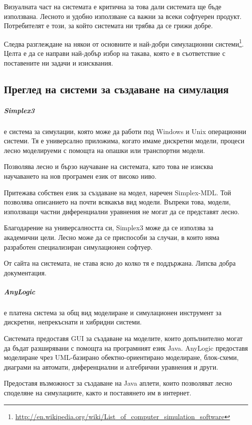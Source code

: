 		Визуалната част на системата е критична за това дали системата ще бъде използвана.
		Лесното и удобно използване са важни за всеки софтуерен продукт. 
		Потребителят е този, за който системата ни трябва да се грижи добре. \cite{Microsoft}
		
		Следва разглеждане на някои от основните и най-добри симулационни 
		системи\footnote{\url{http://en.wikipedia.org/wiki/List_of_computer_simulation_software}}.
		Целта е да се направи най-добър избор на такава, която е в съответствие
		с поставените ни задачи и изисквания.
	
	\subsection{Преглед на системи за създаване на симулация}
	
		\subparagraph{Simplex3} е система за симулации, която може да работи под Windows и Unix операционни системи.
			Тя е универсално приложима, когато имаме дискретни модели, процеси 
			лесно моделируеми с помощта на опашки или транспортни модели.
						
			Позволява лесно и бързо научаване на системата, като това не изисква
			научаването на нов програмен език от високо ниво.			

			Притежава собствен език за създаване на модел, наречен Simplex-MDL. 
			Той позволява описанието на почти всякакъв вид модели. Въпреки това,
			модели, използващи частни диференциални уравнения не могат да се представят
			лесно.
		
			Благодарение на универсалността си, Simplex3 може да се използва за академични цели.
			Лесно може да се приспособи за случаи, в които няма разработен специализиран симулационен
			софтуер. 
		
			От сайта на системата, не става ясно до колко тя е поддържана. 
			Липсва добра документация.\cite{Simplex3}
		
		\subparagraph{AnyLogic} е платена система за общ вид моделиране и симулационен инструмент за 
			дискретни, непрекъснати и хибридни системи.
			
			Системата предоставя \ac{GUI} за създаване на моделите, 
			които допълнително могат да бъдат разширявани с помощта на програмният език Java. 			
			AnyLogic предоставя моделиране чрез UML-базирано обектно-ориентирано моделиране, блок-схеми, 
			диаграми на автомати, диференциални и алгебрични уравнения и други.

				Предоставя възможност за създаване на Java аплети, които позволяват 
			лесно споделяне на симулациите, както и поставянето им в интернет.
	
